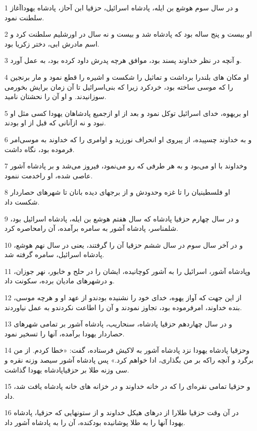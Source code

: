\par 1 و در سال سوم هوشع بن ایله، پادشاه اسرائیل، حزقیا ابن آحاز، پادشاه یهوداآغاز سلطنت نمود.
\par 2 او بیست و پنج ساله بود که پادشاه شد و بیست و نه سال در اورشلیم سلطنت کرد و اسم مادرش ابی، دختر زکریا بود.
\par 3 و آنچه در نظر خداوند پسند بود، موافق هر‌چه پدرش داود کرده بود، به عمل آورد.
\par 4 او مکان های بلندرا برداشت و تماثیل را شکست و اشیره را قطع نمود و مار برنجین را که موسی ساخته بود، خردکرد زیرا که بنی‌اسرائیل تا آن زمان برایش بخورمی سوزانیدند. و او آن را نحشتان نامید.
\par 5 او بریهوه، خدای اسرائیل توکل نمود و بعد از او ازجمیع پادشاهان یهودا کسی مثل او نبود و نه ازآنانی که قبل از او بودند.
\par 6 و به خداوند چسپیده، از پیروی او انحراف نورزید و اوامری را که خداوند به موسی‌امر فرموده بود، نگاه داشت.
\par 7 وخداوند با او می‌بود و به هر طرفی که رو می‌نمود، فیروز می‌شد و بر پادشاه آشور عاصی شده، او راخدمت ننمود.
\par 8 او فلسطینیان را تا غزه وحدودش و از برجهای دیده بانان تا شهرهای حصاردار شکست داد.
\par 9 و در سال چهارم حزقیا پادشاه که سال هفتم هوشع بن ایله، پادشاه اسرائیل بود، شلمناسر، پادشاه آشور به سامره برآمده، آن رامحاصره کرد. 
\par 10 و در آخر سال سوم در سال ششم حزقیا آن را گرفتند، یعنی در سال نهم هوشع، پادشاه اسرائیل، سامره گرفته شد.
\par 11 وپادشاه آشور، اسرائیل را به آشور کوچانیده، ایشان را در حلح و خابور، نهر جوزان، و درشهرهای مادیان برده، سکونت داد.
\par 12 از این جهت که آواز یهوه، خدای خود را نشنیده بودندو از عهد او و هر‌چه موسی، بنده خداوند، امرفرموده بود، تجاوز نمودند و آن را اطاعت نکردندو به عمل نیاوردند.
\par 13 و در سال چهاردهم حزقیا پادشاه، سنحاریب، پادشاه آشور بر تمامی شهرهای حصاردار یهودا برآمده، آنها را تسخیر نمود.
\par 14 وحزقیا پادشاه یهودا نزد پادشاه آشور به لاکیش فرستاده، گفت: «خطا کردم. از من برگرد و آنچه راکه بر من بگذاری، ادا خواهم کرد.» پس پادشاه آشور سیصد وزنه نقره و سی وزنه طلا بر حزقیاپادشاه یهودا گذاشت.
\par 15 و حزقیا تمامی نقره‌ای را که در خانه خداوند و در خزانه های خانه پادشاه یافت شد، داد.
\par 16 در آن وقت حزقیا طلارا از درهای هیکل خداوند و از ستونهایی که حزقیا، پادشاه یهودا آنها را به طلا پوشانیده بودکنده، آن را به پادشاه آشور داد.
